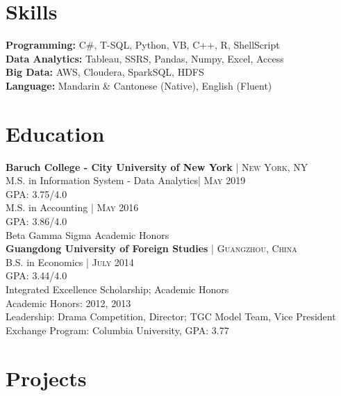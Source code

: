 \documentclass[10pt]{article} %
\begin{document}
{\begin{minipage}[t]{0.47\textwidth}
\section{Skills} 
  \textbf{Programming:} C\#, T-SQL, Python, VB, C++, R, ShellScript\\
  \textbf{Data Analytics:} Tableau, SSRS, Pandas, Numpy, Excel, Access\\
  \textbf{Big Data:} AWS, Cloudera, SparkSQL, HDFS \\
  \textbf{Language:} Mandarin \& Cantonese (Native), English (Fluent)


\section{Education} 


\textbf{Baruch College - City University of New York} {\hfill\footnotesize\textsc{| New York, NY}}\\
M.S. in Information System - Data Analytics{\hfill\footnotesize\textsc{| May 2019}}\\ 
GPA: 3.75/4.0\\
M.S. in Accounting {\hfill\footnotesize\textsc{| May 2016}}\\ 
GPA: 3.86/4.0\\
Beta Gamma Sigma Academic Honors\\

\textbf{Guangdong University of Foreign Studies} {\hfill\footnotesize\textsc{| Guangzhou, China}}\\
B.S. in Economics {\hfill\footnotesize\textsc{| July 2014}}\\
GPA: 3.44/4.0\\
Integrated Excellence Scholarship; Academic Honors\\
Academic Honors: 2012, 2013\\
Leadership: Drama Competition, Director; TGC Model Team, Vice President\\
Exchange Program: Columbia University, GPA: 3.77\\


\section{Projects} 


\end{minipage}}
\end{document}
